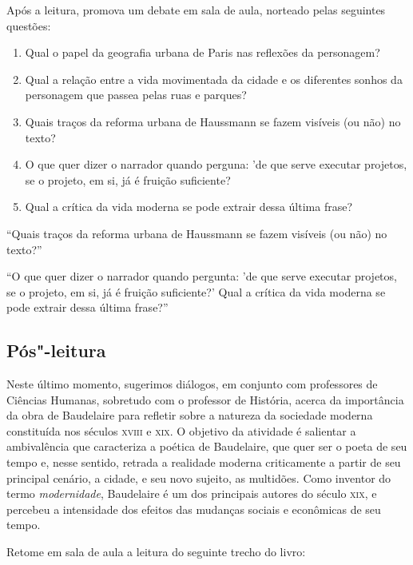 \documentclass[12pt]{extarticle}
\begin{document}
Após a leitura, promova um debate em sala de aula, norteado pelas seguintes questões:

\begin{enumerate}
\item Qual o papel da geografia urbana de Paris nas reflexões da personagem?
\item Qual a relação entre a vida movimentada da cidade e os diferentes sonhos da personagem que passea pelas ruas e parques?
\item Quais traços da reforma urbana de Haussmann se fazem visíveis (ou não) no texto?
\item O que quer dizer o narrador quando perguna: 'de que serve executar projetos, se o projeto, em si, já é fruição suficiente?
\item Qual a crítica da vida moderna se pode extrair dessa última frase?
\end{enumerate}




``Quais traços da reforma urbana de Haussmann se fazem visíveis (ou não) no texto?''

``O que quer dizer o narrador quando pergunta: 'de que serve executar projetos, se o projeto, em si, já é fruição suficiente?' Qual a crítica da vida moderna se pode extrair dessa última frase?''

\subsection{Pós"-leitura}

Neste último momento, sugerimos diálogos, em conjunto com
professores de Ciências Humanas, sobretudo com o professor de História, acerca da importância da obra de Baudelaire para refletir sobre
a natureza da sociedade moderna constituída nos séculos \textsc{xviii} e \textsc{xix}. O objetivo da atividade é salientar a ambivalência que caracteriza a poética de Baudelaire, que quer ser o poeta de seu tempo e, nesse sentido, retrada a realidade moderna criticamente a partir de seu principal cenário, a cidade, e seu novo sujeito, as multidões. Como inventor do termo \textit{modernidade}, Baudelaire é um dos principais autores do século \textsc{xix}, e percebeu a intensidade dos efeitos das mudanças sociais e econômicas de seu tempo.

Retome em sala de aula a leitura do seguinte trecho do livro:
\end{document}
